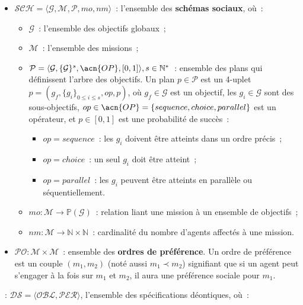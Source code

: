 \begin{itemize}
  \item $\mathcal{SCH} = \langle\mathcal{G}, \mathcal{M}, \mathcal{P}, mo, nm \rangle$~: l'ensemble des \textbf{schémas sociaux}, où~:
        \begin{itemize}
          \item $\mathcal{G}$~: l'ensemble des objectifs globaux~;
          \item $\mathcal{M}$~: l'ensemble des missions~;
          \item $\mathcal{P} = \langle \mathcal{G}, \{\mathcal{G}\}^s, \acn{OP}, [0,1] \rangle, s \in \mathbb{N}^*$~: ensemble des plans qui définissent l'arbre des objectifs.
                Un plan $p \in \mathcal{P}$ est un 4-uplet $p = (g_f, \{g_i\}_{0 \leq i \leq s}, op, p)$, où $g_f \in \mathcal{G}$ est un objectif, les $g_i \in \mathcal{G}$ sont des sous-objectifs, $op \in \acn{OP} = \{sequence, choice, parallel\}$ est un opérateur, et $p \in [0,1]$ est une probabilité de succès~:
                \begin{itemize}
                  \item $op = sequence$~: les $g_i$ doivent être atteints dans un ordre précis~;
                  \item $op = choice$~: un seul $g_i$ doit être atteint~;
                  \item $op = parallel$~: les $g_i$ peuvent être atteints en parallèle ou séquentiellement.
                \end{itemize}
          \item $mo: \mathcal{M} \rightarrow \mathbb{P}(\mathcal{G})$~: relation liant une mission à un ensemble de objectifs~;
          \item $nm: \mathcal{M} \rightarrow \mathbb{N} \times \mathbb{N}$~: cardinalité du nombre d'agents affectés à une mission.
        \end{itemize}
  \item $\mathcal{PO}: \mathcal{M} \times \mathcal{M}$~: ensemble des \textbf{ordres de préférence}. Un ordre de préférence est un couple $(m_1, m_2)$ (noté aussi $m_1 \prec m_2$) signifiant que si un agent peut s'engager à la fois sur $m_1$ et $m_2$, il aura une préférence sociale pour $m_1$.
\end{itemize}

\medskip

\noindent \textbf{}~: \quad $\mathcal{DS} = \langle \mathcal{OBL}, \mathcal{PER} \rangle$, l'ensemble des spécifications déontiques, où~:

